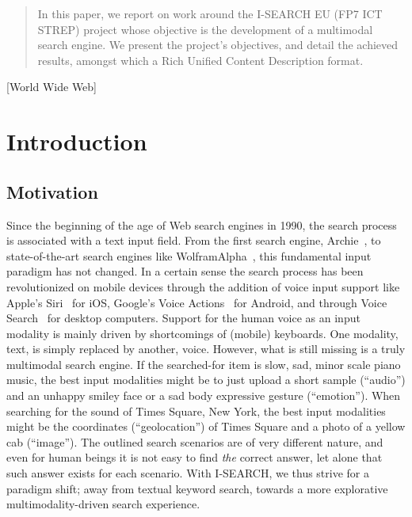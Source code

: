 \documentclass{acm_proc_article-sp}
\let\oldemph\emph
\renewcommand{\emph}[1]{\oldemph{\fontsize{9}{9}\selectfont #1}}
\newcommand{\inlinelistingsize}{\fontsize{8pt}{11pt}}
\let\oldurl\url
\renewcommand{\url}[1]{\inlinelistingsize\oldurl{#1}}
\begin{document}
\begin{abstract}
In this paper, we report on work around the \mbox{I-SEARCH} EU (FP7 ICT STREP) project whose objective is the development of a multimodal search engine.
We present the project's objectives, and detail the achieved results, amongst which a Rich Unified Content Description format. 
\end{abstract}

[World Wide Web]


\section{Introduction}
\subsection{Motivation}
Since the beginning of the age of Web search engines in 1990, the search process is associated with a text input field.
From the first search engine, Archie~\cite{archie}, to state-of-the-art search engines like WolframAlpha~\cite{wolframalpha}, this fundamental input paradigm has not changed.
In a certain sense the search process has been revolutionized on mobile devices through the addition of voice input support like Apple's Siri~\cite{siri} for iOS, Google's Voice Actions~\cite{voiceactions} for Android, and through Voice Search~\cite{voicesearch} for desktop computers.
Support for the human voice as an input modality is mainly driven by shortcomings of (mobile) keyboards.
One modality, text, is simply replaced by another, voice.
However, what is still missing is a truly multimodal search engine.
If the searched-for item is slow, sad, minor scale piano music,
the best input modalities might be to just upload a short
sample (``audio'') and an unhappy smiley face or a sad body expressive gesture (``emotion'').
When searching for the sound of Times Square, New York,
the best input modalities might be the coordinates (``geolocation'') of Times Square and a photo of a yellow cab (``image'').
The outlined search scenarios are of very different nature, and even for human beings it is not easy to find \emph{the} correct answer, let alone that such answer exists for each scenario.
With \mbox{I-SEARCH}, we thus strive for a paradigm shift; away from textual keyword search, towards a more explorative multimodality-driven search experience.
\end{document}
